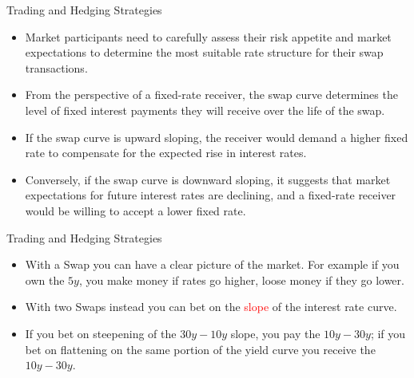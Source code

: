 \documentclass{beamer}
\begin{document}
\begin{frame}{Trading and Hedging Strategies}
\begin{itemize}
\item Market participants need to carefully assess their risk appetite and market expectations to determine the most suitable rate structure for their swap transactions.
\item From the perspective of a fixed-rate receiver, the swap curve determines the level of fixed interest payments they will receive over the life of the swap. 
\item If the swap curve is upward sloping, the receiver would demand a higher fixed rate to compensate for the expected rise in interest rates. 
\item Conversely, if the swap curve is downward sloping, it suggests that market expectations for future interest rates are declining, and a fixed-rate receiver would be willing to accept a lower fixed rate.
\end{itemize}
\end{frame}

\begin{frame}{Trading and Hedging Strategies}
	\begin{itemize}
		\item With a Swap you can have a clear picture of the market. For example if you own the $5y$, you make money if rates go higher, loose money if they go lower.
		\item With two Swaps instead you can bet on the \textcolor{red}{slope} of the interest rate curve.
		\item If you bet on steepening of the $30y-10y$ slope, you pay the $10y-30y$; if you bet on flattening on the same portion of the yield curve you receive the $10y-30y$.		
	\end{itemize}
\end{frame}

\end{document}
